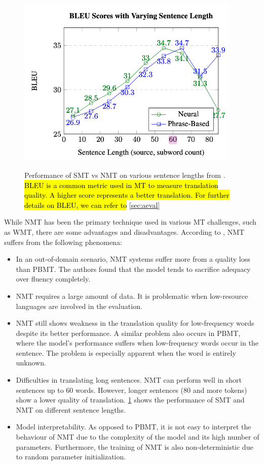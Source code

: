 \begin{figure}[h]
    {\includegraphics[width=0.95\textwidth]{img/bleusentencelength.png}}
    \centering
    \caption{Performance of SMT vs NMT on various sentence lengths from . \hl{BLEU is a common metric used in MT to measure translation quality. A higher score represents a better translation. For further details on BLEU, we can refer to }\cref{sec:aeval}}
    \label{img:bleusentlength}
\end{figure}


While NMT has been the primary technique used in various MT challenges, such as WMT, there are some advantages and disadvantages. According to , NMT suffers from the following phenomena:
\begin{itemize}
    \item In an out-of-domain scenario, NMT systems suffer more from a quality loss than PBMT. The authors found that the model tends to sacrifice adequacy over fluency completely.

    \item NMT requires a large amount of data. It is problematic when low-resource languages are involved in the evaluation.

    \item NMT still shows weakness in the translation quality for low-frequency words despite its better performance. A similar problem also occurs in PBMT, where the model's performance suffers when low-frequency words occur in the sentence. The problem is especially apparent when the word is entirely unknown.

    \item Difficulties in translating long sentences. NMT can perform well in short sentences up to 60 words. However, longer sentences (80 and more tokens) show a lower quality of translation. \cref{img:bleusentlength} shows the performance of SMT and NMT on different sentence lengths.

    \item Model interpretability. As opposed to PBMT, it is not easy to interpret the behaviour of NMT due to the complexity of the model and its high number of parameters. Furthermore, the training of NMT is also non-deterministic due to random parameter initialization.
\end{itemize}

